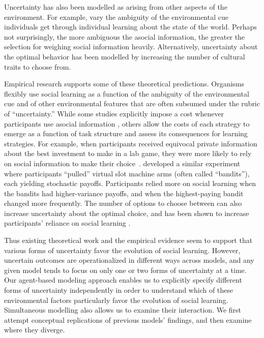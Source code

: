 \documentclass[letterpaper,11.5pt]{scrartcl}
\begin{document}
Uncertainty has also been modelled as arising from other aspects of the environment. 
For example,  vary the ambiguity of the environmental cue individuals get through individual learning about the state of the world. Perhaps not surprisingly, the more ambiguous the asocial information, the greater the selection for weighing social information heavily. Alternatively, uncertainty about the optimal behavior has been modelled by increasing the number of cultural traits to choose from. 

Empirical research supports some of these theoretical predictions. Organisms flexibly use social learning as a function of the ambiguity of the environmental cue and of other environmental features that are often subsumed under the rubric of ``uncertainty.''
While some studies explicitly impose a cost whenever participants use asocial
information \cite{Morgan2012,atkisson_etal2012}, 
others allow the costs of each strategy to emerge as a function of task structure and assess its consequences for learning strategies. 
For example, when participants received equivocal private information about the best investment to make in a lab game,
they were more likely to rely on social information to make their choice~\cite{Toelch2013}. 
 developed a similar experiment where participants ``pulled'' virtual slot machine arms (often called ``bandits''), each yielding stochastic payoffs. Participants relied more on social learning when the bandits had higher-variance payoffs, and when the highest-paying bandit changed more frequently. 
The number of options to choose between can also increase uncertainty about the optimal choice, and has been shown to increase participants' reliance on social learning \cite{Muthukrishna2016a}. 

Thus existing theoretical work and the empirical evidence seem to support that various forms of uncertainty favor the evolution of social learning. However, uncertain outcomes are operationalized in different ways across models, and any given model tends to focus on only one or two forms of uncertainty at a time. Our agent-based modeling approach enables us to explicitly specify different forms of uncertainty independently in order to understand which of these environmental factors particularly favor the evolution of social learning. Simultaneous modelling also allows us to examine their interaction. We first attempt conceptual replications of previous models' findings, and then examine where they diverge.
\end{document}
